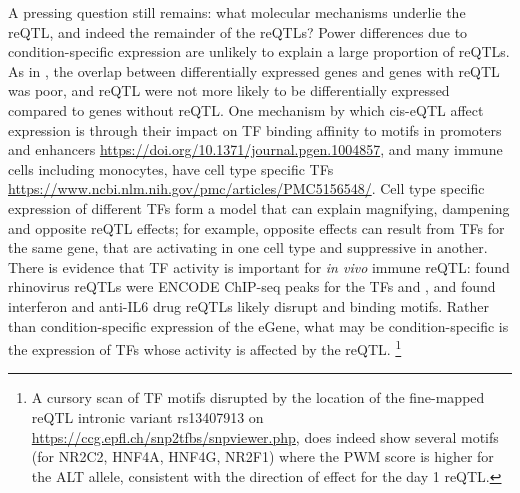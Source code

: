 A pressing question still remains: what molecular mechanisms underlie the  \gls{reQTL}, and indeed the remainder of the \glspl{reQTL}?
Power differences due to condition-specific expression are unlikely to explain a large proportion of reQTLs.
As in \autocite{kim-hellmuth2017GeneticRegulatoryEffects, davenport2018DiscoveringVivoCytokineeQTL}, the overlap between differentially expressed genes and genes with reQTL was poor,
and reQTL were not more likely to be differentially expressed compared to genes without reQTL.
One mechanism by which cis-eQTL affect expression is through their impact on \gls{TF} binding affinity to motifs in promoters and enhancers \url{https://doi.org/10.1371/journal.pgen.1004857},
and many immune cells including monocytes, have cell type specific \glspl{TF} \url{https://www.ncbi.nlm.nih.gov/pmc/articles/PMC5156548/}.
Cell type specific expression of different \glspl{TF} form a model that can explain magnifying, dampening and opposite reQTL effects;
for example, opposite effects can result from \glspl{TF} for the same gene, that are activating in one cell type and suppressive in another\autocite{fu2012UnravelingRegulatoryMechanisms}.
There is evidence that \gls{TF} activity is important for \textit{in vivo} immune reQTL:
\autocite{caliskan2015HostGeneticVariation} found rhinovirus reQTLs were ENCODE ChIP-seq peaks for the \glspl{TF}  and ,
and \autocite{davenport2018DiscoveringVivoCytokineeQTL} found interferon and anti-IL6 drug reQTLs likely disrupt  and  binding motifs.
Rather than condition-specific expression of the eGene, what may be condition-specific is the expression of \glspl{TF} whose activity is affected by the reQTL.
\footnote{
    A cursory scan of \gls{TF} motifs disrupted by the location of the fine-mapped  reQTL intronic variant rs13407913 on \url{https://ccg.epfl.ch/snp2tfbs/snpviewer.php},
    does indeed show several motifs (for NR2C2, HNF4A, HNF4G, NR2F1)
    where the PWM score is higher for the ALT allele, 
    consistent with the direction of effect for the day 1 reQTL.
}

